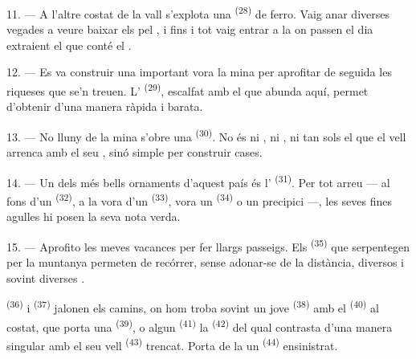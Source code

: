 11. --- A l'altre costat de la vall s'explota una 
\textsuperscript{(28)} de ferro. Vaig anar diverses vegades a veure baixar els
 pel , i fins i tot vaig entrar a la 
on passen el dia extraient el  que conté el .

12. --- Es va construir una important  vora la mina per aprofitar
de seguida les riqueses que se'n treuen. L'
\textsuperscript{(29)}, escalfat amb el  que abunda aquí,
permet d'obtenir  d'una manera ràpida i barata.

13. --- No lluny de la mina s'obre una  \textsuperscript{(30)}. No
és ni , ni , ni tan sols  el que el
vell  arrenca amb el seu , sinó simple
 per construir cases.

14. --- Un dels més bells ornaments d'aquest país és l'
\textsuperscript{(31)}. Per tot arreu --- al fons d'un 
\textsuperscript{(32)}, a la vora d'un  \textsuperscript{(33)},
vora un  \textsuperscript{(34)} o un precipici ---, les seves fines
agulles hi posen la seva nota verda.

\VUsaut{3.0mm}
\VUsaut{3.0mm}

15. --- Aprofito les meves vacances per fer llargs passeigs. Els 
\textsuperscript{(35)} que serpentegen per la muntanya permeten de recórrer, sense
adonar-se de la distància, diversos  i sovint diverses
.

 \textsuperscript{(36)} i 
\textsuperscript{(37)} jalonen els camins, on hom troba sovint un jove
 \textsuperscript{(38)} amb el 
\textsuperscript{(40)} al costat, que porta una 
\textsuperscript{(39)}, o algun  \textsuperscript{(41)} la
 \textsuperscript{(42)} del qual contrasta d'una manera
singular amb el seu vell  \textsuperscript{(43)} trencat. Porta de
la  un  \textsuperscript{(44)} ensinistrat.

\VUsaut{3.0mm}

